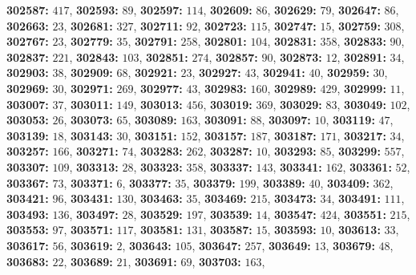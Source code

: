 \textsf{\bfseries 302587:} $417$, \textsf{\bfseries 302593:} $89$, \textsf{\bfseries 302597:} $114$, \textsf{\bfseries 302609:} $86$, \textsf{\bfseries 302629:} $79$, \textsf{\bfseries 302647:} $86$, \textsf{\bfseries 302663:} $23$, \textsf{\bfseries 302681:} $327$, \textsf{\bfseries 302711:} $92$, \textsf{\bfseries 302723:} $115$, \textsf{\bfseries 302747:} $15$, \textsf{\bfseries 302759:} $308$, \textsf{\bfseries 302767:} $23$, \textsf{\bfseries 302779:} $35$, \textsf{\bfseries 302791:} $258$, \textsf{\bfseries 302801:} $104$, \textsf{\bfseries 302831:} $358$, \textsf{\bfseries 302833:} $90$, \textsf{\bfseries 302837:} $221$, \textsf{\bfseries 302843:} $103$, \textsf{\bfseries 302851:} $274$, \textsf{\bfseries 302857:} $90$, \textsf{\bfseries 302873:} $12$, \textsf{\bfseries 302891:} $34$, \textsf{\bfseries 302903:} $38$, \textsf{\bfseries 302909:} $68$, \textsf{\bfseries 302921:} $23$, \textsf{\bfseries 302927:} $43$, \textsf{\bfseries 302941:} $40$, \textsf{\bfseries 302959:} $30$, \textsf{\bfseries 302969:} $30$, \textsf{\bfseries 302971:} $269$, \textsf{\bfseries 302977:} $43$, \textsf{\bfseries 302983:} $160$, \textsf{\bfseries 302989:} $429$, \textsf{\bfseries 302999:} $11$, \textsf{\bfseries 303007:} $37$, \textsf{\bfseries 303011:} $149$, \textsf{\bfseries 303013:} $456$, \textsf{\bfseries 303019:} $369$, \textsf{\bfseries 303029:} $83$, \textsf{\bfseries 303049:} $102$, \textsf{\bfseries 303053:} $26$, \textsf{\bfseries 303073:} $65$, \textsf{\bfseries 303089:} $163$, \textsf{\bfseries 303091:} $88$, \textsf{\bfseries 303097:} $10$, \textsf{\bfseries 303119:} $47$, \textsf{\bfseries 303139:} $18$, \textsf{\bfseries 303143:} $30$, \textsf{\bfseries 303151:} $152$, \textsf{\bfseries 303157:} $187$, \textsf{\bfseries 303187:} $171$, \textsf{\bfseries 303217:} $34$, \textsf{\bfseries 303257:} $166$, \textsf{\bfseries 303271:} $74$, \textsf{\bfseries 303283:} $262$, \textsf{\bfseries 303287:} $10$, \textsf{\bfseries 303293:} $85$, \textsf{\bfseries 303299:} $557$, \textsf{\bfseries 303307:} $109$, \textsf{\bfseries 303313:} $28$, \textsf{\bfseries 303323:} $358$, \textsf{\bfseries 303337:} $143$, \textsf{\bfseries 303341:} $162$, \textsf{\bfseries 303361:} $52$, \textsf{\bfseries 303367:} $73$, \textsf{\bfseries 303371:} $6$, \textsf{\bfseries 303377:} $35$, \textsf{\bfseries 303379:} $199$, \textsf{\bfseries 303389:} $40$, \textsf{\bfseries 303409:} $362$, \textsf{\bfseries 303421:} $96$, \textsf{\bfseries 303431:} $130$, \textsf{\bfseries 303463:} $35$, \textsf{\bfseries 303469:} $215$, \textsf{\bfseries 303473:} $34$, \textsf{\bfseries 303491:} $111$, \textsf{\bfseries 303493:} $136$, \textsf{\bfseries 303497:} $28$, \textsf{\bfseries 303529:} $197$, \textsf{\bfseries 303539:} $14$, \textsf{\bfseries 303547:} $424$, \textsf{\bfseries 303551:} $215$, \textsf{\bfseries 303553:} $97$, \textsf{\bfseries 303571:} $117$, \textsf{\bfseries 303581:} $131$, \textsf{\bfseries 303587:} $15$, \textsf{\bfseries 303593:} $10$, \textsf{\bfseries 303613:} $33$, \textsf{\bfseries 303617:} $56$, \textsf{\bfseries 303619:} $2$, \textsf{\bfseries 303643:} $105$, \textsf{\bfseries 303647:} $257$, \textsf{\bfseries 303649:} $13$, \textsf{\bfseries 303679:} $48$, \textsf{\bfseries 303683:} $22$, \textsf{\bfseries 303689:} $21$, \textsf{\bfseries 303691:} $69$, \textsf{\bfseries 303703:} $163$, 
